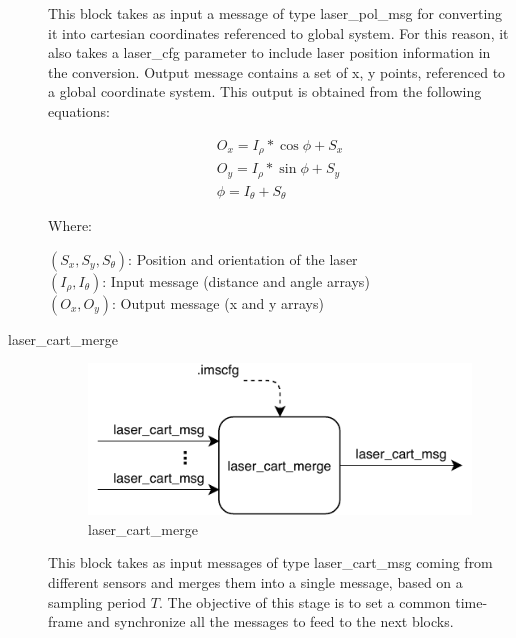 \begin{description}
This block takes as input a message of type laser\_pol\_msg for converting it into cartesian coordinates referenced to global system. For this reason, it also takes a laser\_cfg parameter to include laser position information in the conversion. Output message contains a set of x, y points, referenced to a global coordinate system. This output is obtained from the following equations:

\begin{eqnarray*}
O_x = I_\rho*\cos{\phi}+S_x \\
O_y = I_\rho*\sin{\phi} + S_y \\
\phi = I_\theta + S_\theta
\end{eqnarray*}

Where:

$(S_x, S_y, S_\theta)$: Position and orientation of the laser \\
$(I_\rho, I_\theta )$: Input message (distance and angle arrays) \\
$(O_x, O_y )$: Output message (x and y arrays) \\

\hfill
\item[laser\_cart\_merge] \hfill

\begin{figure}[ht!]
\centering
\includegraphics[scale=1]{fig/3/laser_cart_merge.pdf}
\caption{laser\_cart\_merge}
\label{laser_cart_merge}
\end{figure}

This block takes as input messages of type laser\_cart\_msg coming from different sensors and merges them into a single message, based on a sampling period $T$. The objective of this stage is to set a common time-frame and synchronize all the messages to feed to the next blocks.

%

\end{description}


